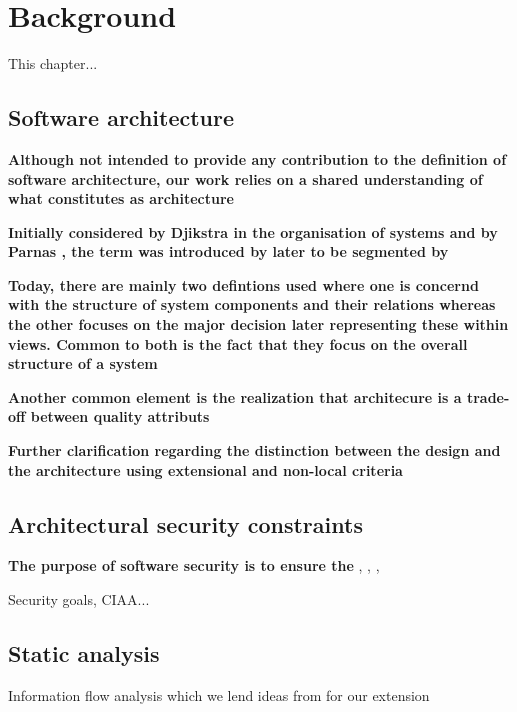 \chapter{Background}

This chapter...

\section{Software architecture}
\textbf{Although not intended to provide any contribution to the definition of software architecture, our work relies on a shared understanding of what constitutes as architecture}

\textbf{Initially considered by Djikstra in the organisation of systems and by Parnas \cite{broy_criteria_1972, parnas_design_1976}, the term was introduced by \cite{perry_foundations_1992} later to be segmented by \cite{ambriola_introduction_1993}}

\textbf{Today, there are mainly two defintions used where one is concernd with the structure of system components and their relations \cite{bass_software_2013} whereas the other focuses on the major decision \cite{jansen_software_2005} later representing these within views. Common to both is the fact that they focus on the overall structure of a system}

\textbf{Another common element is the realization that architecure is a trade-off between quality attributs}

\textbf{Further clarification regarding the distinction between the design and the architecture \cite{eden_architecture_2003}using extensional and non-local criteria}

\section{Architectural security constraints}

\textbf{The purpose of software security is to ensure the}
\cite{broy_software_2007}, \cite{felderer_security_2016}, \cite{haley_security_2008}, 

Security goals, CIAA...

\section{Static analysis}

Information flow analysis \cite{hutchison_information_2005} which we lend ideas from for our extension

